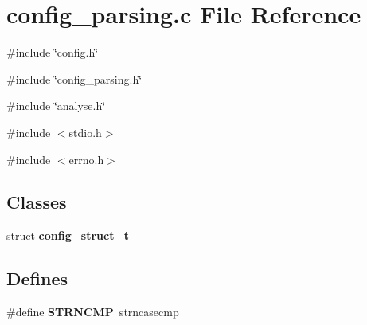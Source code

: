 \section{config\_\-parsing.c File Reference}
\label{config__parsing_8c}
{\ttfamily \#include \char`\"{}config.h\char`\"{}}\par
{\ttfamily \#include \char`\"{}config\_\-parsing.h\char`\"{}}\par
{\ttfamily \#include \char`\"{}analyse.h\char`\"{}}\par
{\ttfamily \#include $<$stdio.h$>$}\par
{\ttfamily \#include $<$errno.h$>$}\par
\subsection*{Classes}
\begin{DoxyCompactItemize}
\item 
struct {\bf config\_\-struct\_\-t}
\end{DoxyCompactItemize}
\subsection*{Defines}
\begin{DoxyCompactItemize}
\item 
\#define {\bf STRNCMP}~strncasecmp
\end{DoxyCompactItemize}
